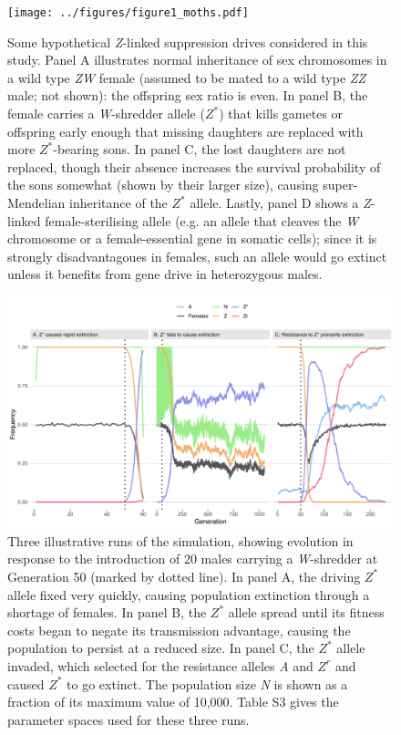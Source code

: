 \documentclass[]{rsos}%
\begin{document}
\begin{figure}[h]
\centering
\texttt{[image: ../figures/figure1\_moths.pdf]}
\caption{\footnotesize{Some hypothetical \textit{Z}-linked suppression drives considered in this study. Panel A illustrates normal inheritance of sex chromosomes in a wild type \textit{ZW} female (assumed to be mated to a wild type \textit{ZZ} male; not shown): the offspring sex ratio is even. In panel B, the female carries a \textit{W}-shredder allele ($Z^*$) that kills gametes or offspring early enough that missing daughters are replaced with more $Z^*$-bearing sons. In panel C, the lost daughters are not replaced, though their absence increases the survival probability of the sons somewhat (shown by their larger size), causing super-Mendelian inheritance of the $Z^*$ allele. Lastly, panel D shows a \textit{Z}-linked female-sterilising allele (e.g. an allele that cleaves the \textit{W} chromosome or a female-essential gene in somatic cells); since it is strongly disadvantagoues in females, such an allele would go extinct unless it benefits from gene drive in heterozygous males.}}
\end{figure}
\newpage

\begin{figure}[h]
\centering
\includegraphics[width=1.0\textwidth]{../figures/figure1.pdf}
\caption{\footnotesize{Three illustrative runs of the simulation, showing evolution in response to the introduction of 20 males carrying a \textit{W}-shredder at Generation 50 (marked by dotted line). In panel A, the driving $Z^*$ allele fixed very quickly, causing population extinction through a shortage of females. In panel B, the $Z^*$ allele spread until its fitness costs began to negate its transmission advantage, causing the population to persist at a reduced size. In panel C, the $Z^*$ allele invaded, which selected for the resistance alleles \textit{A} and $Z^r$ and caused $Z^*$ to go extinct. The population size \textit{N} is shown as a fraction of its maximum value of 10,000. Table S3 gives the parameter spaces used for these three runs.}}
\end{figure}
\newpage
\end{document}
